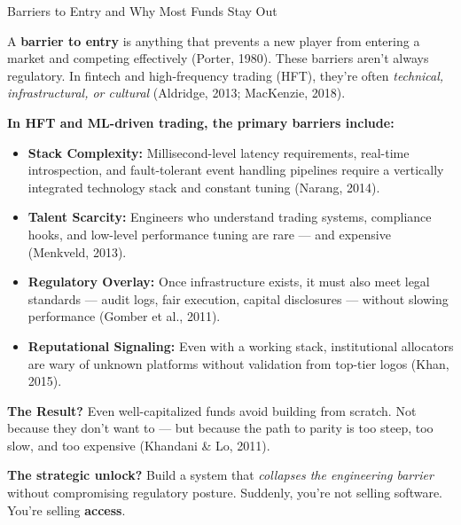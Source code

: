 \begin{TechnicalSidebar}{Barriers to Entry and Why Most Funds Stay Out}

    A \textbf{barrier to entry} is anything that prevents a new player from entering a market 
    and competing effectively (Porter, 1980). These barriers aren’t always regulatory. In fintech 
    and high-frequency trading (HFT), they’re often \textit{technical, infrastructural, or cultural} 
    (Aldridge, 2013; MacKenzie, 2018).
  
    \medskip
    
    \textbf{In HFT and ML-driven trading, the primary barriers include:}
  
    \medskip
    
    \begin{itemize}
      \item \textbf{Stack Complexity:}  
      Millisecond-level latency requirements, real-time introspection, and fault-tolerant 
      event handling pipelines require a vertically integrated technology stack and 
      constant tuning (Narang, 2014).
    
      \item \textbf{Talent Scarcity:}  
      Engineers who understand trading systems, compliance hooks, and low-level performance 
      tuning are rare — and expensive (Menkveld, 2013).
    
      \item \textbf{Regulatory Overlay:}  
      Once infrastructure exists, it must also meet legal standards — audit logs, fair 
      execution, capital disclosures — without slowing performance (Gomber et al., 2011).
    
      \item \textbf{Reputational Signaling:}  
      Even with a working stack, institutional allocators are wary of unknown platforms 
      without validation from top-tier logos (Khan, 2015).
    \end{itemize}
    
    \medskip
    
    \textbf{The Result?}  
    Even well-capitalized funds avoid building from scratch.  
    Not because they don’t want to — but because the path to parity is too steep, too 
    slow, and too expensive (Khandani \& Lo, 2011).
  
    \medskip
    
    \textbf{The strategic unlock?}  
    Build a system that \textit{collapses the engineering barrier} without compromising 
    regulatory posture. Suddenly, you’re not selling software. You’re selling \textbf{access}.
    
\end{TechnicalSidebar}


